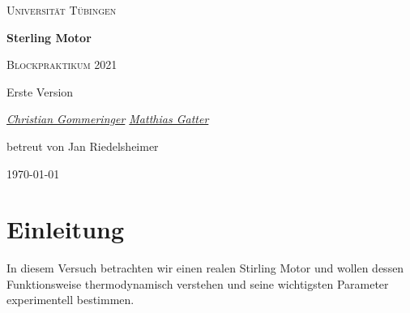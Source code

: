 \documentclass[a4paper, 12pt,]{scrartcl}
\begin{document}
\begin{titlepage}
	\centering
	{\scshape\LARGE Universität Tübingen \par}
	\vspace{2cm}
	{\huge\bfseries Sterling Motor \par}
	\vspace{2cm}
	{\Large \scshape Blockpraktikum 2021} \par
	\vspace{2cm}
	{\Large  Erste Version} \par
	\vspace{2cm}
	{\Large\itshape \underline{Christian Gommeringer} \space \space  \underline{Matthias Gatter}\par}
	\vfill 
	{\large betreut von Jan Riedelsheimer}
	\vfill

	{\large \today\par}
\end{titlepage}
\newpage 
\tableofcontents 

\newpage
\section{Einleitung}
\begin{flushleft}

In diesem Versuch betrachten wir einen realen Stirling Motor und wollen dessen Funktionsweise thermodynamisch verstehen und seine wichtigsten Parameter experimentell bestimmen.

\end{flushleft}
\end{document}
